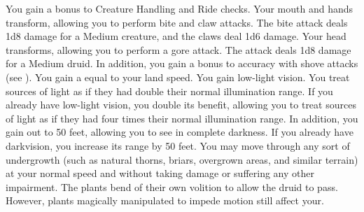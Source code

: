             You gain a  bonus to Creature Handling and Ride checks.
            Your mouth and hands transform, allowing you to perform bite and claw attacks.
            The bite attack deals 1d8 damage for a Medium creature, and the claws deal 1d6 damage.
            Your head transforms, allowing you to perform a gore attack.
            The attack deals 1d8 damage for a Medium druid.
            In addition, you gain a  bonus to accuracy with shove attacks (see ).
            You gain a  equal to your land speed.
            You gain low-light vision.
            You treat sources of light as if they had double their normal illumination range.
            If you already have low-light vision, you double its benefit, allowing you to treat sources of light as if they had four times their normal illumination range.
            In addition, you gain  out to 50 feet, allowing you to see in complete darkness.
            If you already have darkvision, you increase its range by 50 feet.
            You may move through any sort of undergrowth (such as natural thorns, briars, overgrown areas, and similar terrain) at your normal speed and without taking damage or suffering any other impairment.
            The plants bend of their own volition to allow the druid to pass.
            However, plants magically manipulated to impede motion still affect your.

